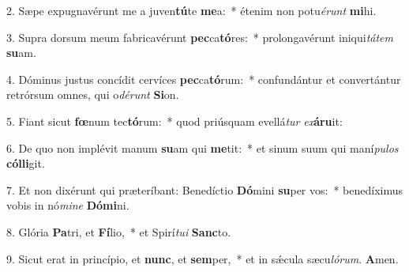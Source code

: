 2. Sæpe expugnavérunt me a juven\textbf{tú}te \textbf{me}a:~*  étenim non potu\textit{é}\textit{runt} \textbf{mi}hi.\

3. Supra dorsum meum fabricavérunt \textbf{pec}ca\textbf{tó}res:~*  prolongavérunt iniqui\textit{tá}\textit{tem} \textbf{su}am.\

4. Dóminus justus concídit cervíces \textbf{pec}ca\textbf{tó}rum:~*  confundántur et convertántur retrórsum omnes, qui o\textit{dé}\textit{runt} \textbf{Si}on.\

5. Fiant sicut \textbf{fœ}num tec\textbf{tó}rum:~*  quod priúsquam evellá\textit{tur} \textit{ex}\textbf{á}\textbf{ru}it:\

6. De quo non implévit manum \textbf{su}am qui \textbf{me}tit:~*  et sinum suum qui maní\textit{pu}\textit{los} \textbf{cól}\textbf{li}git.\

7. Et non dixérunt qui præteríbant: Benedíctio \textbf{Dó}mini \textbf{su}per vos:~*  benedíximus vobis in nó\textit{mi}\textit{ne} \textbf{Dó}\textbf{mi}ni.\

8. Glória \textbf{Pa}tri, et \textbf{Fí}lio,~*  et Spirí\textit{tu}\textit{i} \textbf{Sanc}to.\

9. Sicut erat in princípio, et \textbf{nunc}, et \textbf{sem}per,~*  et in sǽcula sæcu\textit{ló}\textit{rum}. \textbf{A}men.\

